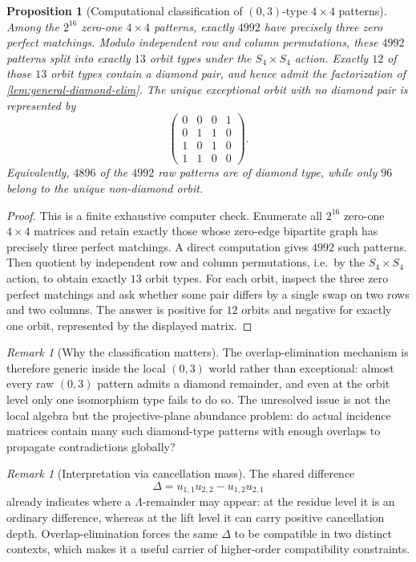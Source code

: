 \documentclass[11pt]{amsart}
\numberwithin{equation}{section}
\theoremstyle{plain}
\newtheorem{proposition}[theorem]{Proposition}
\theoremstyle{definition}
\theoremstyle{remark}
\newtheorem{remark}[theorem]{Remark}
\newcommand{\Lam}{\Lambda}
\begin{document}
\begin{proposition}[Computational classification of $(0,3)$-type $4\times4$ patterns]
\label{prop:03-classification}
Among the $2^{16}$ zero-one $4\times4$ patterns, exactly $4992$ have precisely three zero perfect matchings.
Modulo independent row and column permutations, these $4992$ patterns split into exactly $13$ orbit types under the
$S_4\times S_4$ action. Exactly $12$ of those $13$ orbit types contain a diamond pair, and hence admit the factorization of
\cref{lem:general-diamond-elim}. The unique exceptional orbit with no diamond pair is represented by
\[
\begin{pmatrix}
0&0&0&1\\
0&1&1&0\\
1&0&1&0\\
1&1&0&0
\end{pmatrix}.
\]
Equivalently, $4896$ of the $4992$ raw patterns are of diamond type, while only $96$ belong to the unique non-diamond orbit.
\end{proposition}

\begin{proof}
This is a finite exhaustive computer check. Enumerate all $2^{16}$ zero-one $4\times4$ matrices and retain exactly those whose zero-edge
bipartite graph has precisely three perfect matchings. A direct computation gives $4992$ such patterns.
Then quotient by independent row and column permutations, i.e.\ by the $S_4\times S_4$ action, to obtain exactly $13$ orbit types.
For each orbit, inspect the three zero perfect matchings and ask whether some pair differs by a single swap on two rows and two columns.
The answer is positive for $12$ orbits and negative for exactly one orbit, represented by the displayed matrix.
\end{proof}

\begin{remark}[Why the classification matters]
The overlap-elimination mechanism is therefore generic inside the local $(0,3)$ world rather than exceptional: almost every raw
$(0,3)$ pattern admits a diamond remainder, and even at the orbit level only one isomorphism type fails to do so.
The unresolved issue is not the local algebra but the projective-plane abundance problem: do actual incidence matrices contain many such
diamond-type patterns with enough overlaps to propagate contradictions globally?
\end{remark}

\begin{remark}[Interpretation via cancellation mass]
The shared difference
\[
\Delta=u_{1,1}u_{2,2}-u_{1,2}u_{2,1}
\]
already indicates where a $\Lam$-remainder may appear: at the residue level it is an ordinary difference, whereas at the lift level it
can carry positive cancellation depth. Overlap-elimination forces the same $\Delta$ to be compatible in two distinct contexts, which makes it a useful carrier of higher-order compatibility constraints.
\end{remark}
\end{document}
